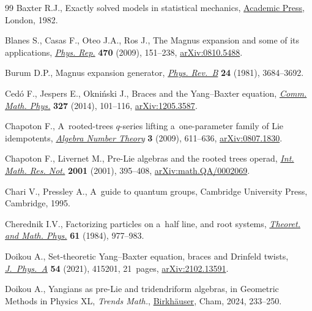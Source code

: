 \documentclass[pdftex]{sigma}
\numberwithin{equation}{section}
\theoremstyle{definition}
\begin{document}
\begin{thebibliography}{99}
Baxter R.J., Exactly solved models in statistical mechanics,
 \href{https://doi.org/10.1142/9789814415255_0002}{Academic Press}, London,
 1982.

Blanes S., Casas F., Oteo J.A., Ros J., The {M}agnus expansion and some of its
 applications,
 \href{https://doi.org/10.1016/j.physrep.2008.11.001}{\textit{Phys. Rep.}}
 \textbf{470} (2009), 151--238,
 \href{http://arxiv.org/abs/0810.5488}{arXiv:0810.5488}.

Burum D.P., Magnus expansion generator,
 \href{https://doi.org/10.1103/PhysRevB.24.3684}{\textit{Phys. Rev.~B}}
 \textbf{24} (1981), 3684--3692.

Ced\'o F., Jespers E., Okni\'{n}ski J., Braces and the {Y}ang--{B}axter
 equation, \href{https://doi.org/10.1007/s00220-014-1935-y}{\textit{Comm.
 Math. Phys.}} \textbf{327} (2014), 101--116,
 \href{http://arxiv.org/abs/1205.3587}{arXiv:1205.3587}.

Chapoton F., A~rooted-trees {$q$}-series lifting a~one-parameter family of
 {L}ie idempotents,
 \href{https://doi.org/10.2140/ant.2009.3.611}{\textit{Algebra Number Theory}}
 \textbf{3} (2009), 611--636,
 \href{http://arxiv.org/abs/0807.1830}{arXiv:0807.1830}.

Chapoton F., Livernet M., Pre-{L}ie algebras and the rooted trees operad,
 \href{https://doi.org/10.1155/S1073792801000198}{\textit{Int. Math. Res.
 Not.}} \textbf{2001} (2001), 395--408,
 \href{http://arxiv.org/abs/math.QA/0002069}{arXiv:math.QA/0002069}.

Chari V., Pressley A., A~guide to quantum groups, Cambridge University Press,
 Cambridge, 1995.

Cherednik I.V., Factorizing particles on a~half line, and root systems,
 \href{https://doi.org/10.1007/BF01038545}{\textit{Theoret. and Math. Phys.}}
 \textbf{61} (1984), 977--983.

Doikou A., Set-theoretic {Y}ang--{B}axter equation, braces and {D}rinfeld
 twists, \href{https://doi.org/10.1088/1751-8121/ac219e}{\textit{J.~Phys.~A}}
 \textbf{54} (2021), 415201, 21~pages,
 \href{http://arxiv.org/abs/2102.13591}{arXiv:2102.13591}.

Doikou A., Yangians as pre-{L}ie and tridendriform algebras, in Geometric
 Methods in Physics {XL}, \textit{Trends Math.},
 \href{https://doi.org/10.1007/978-3-031-62407-0_18}{Birkh\"auser}, Cham,
 2024, 233--250.


\end{thebibliography}
\end{document}

